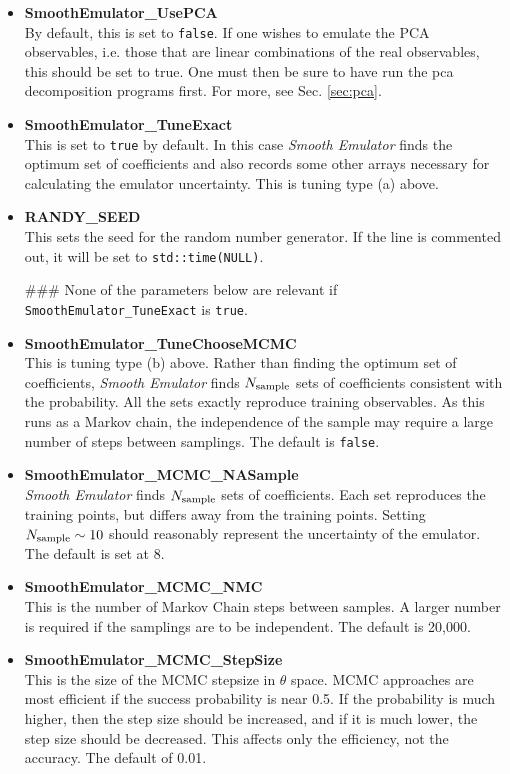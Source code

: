 \documentclass[UserManual.tex]{subfiles}
\begin{document}
\begin{itemize}
\item {\bf SmoothEmulator\_UsePCA}\\
By default, this is set to {\tt false}. If one wishes to emulate the PCA observables, i.e. those that are linear combinations of the real observables, this should be set to true. One must then be sure to have run the pca decomposition programs first. For more, see Sec. \ref{sec:pca}. 

\item {\bf SmoothEmulator\_TuneExact}\\
This is set to {\tt true} by default. In this case {\it Smooth Emulator} finds the optimum set of coefficients and also records some other arrays necessary for calculating the emulator uncertainty. This is tuning type (a) above.

\item {\bf RANDY\_SEED}\\
This sets the seed for the random number generator. If the line is commented out, it will be set to {\tt std::time(NULL)}.

\#\#\# None of the parameters below are relevant if {\tt SmoothEmulator\_TuneExact} is {\tt true}.

\item {\bf SmoothEmulator\_TuneChooseMCMC}\\
This is tuning type (b) above. Rather than finding the optimum set of coefficients, {\it Smooth Emulator} finds $N_{\rm sample}$ sets of coefficients consistent with the probability. All the sets exactly reproduce training observables. As this runs as a Markov chain, the independence of the sample may require a large number of steps between samplings. The default is {\tt false}.

\item {\bf SmoothEmulator\_MCMC\_NASample}\\
{\it Smooth Emulator} finds $N_{\rm sample}$ sets of coefficients. Each set reproduces the training points, but differs away from the training points. Setting $N_{\rm sample}\sim 10$ should reasonably represent the uncertainty of the emulator. The default is set at 8.

\item {\bf SmoothEmulator\_MCMC\_NMC}\\
This is the number of Markov Chain steps between samples. A larger number is required if the samplings are to be independent. The default is 20,000.

\item {\bf SmoothEmulator\_MCMC\_StepSize}\\
This is the size of the MCMC stepsize in $\theta$ space. MCMC approaches are most efficient if the success probability is near 0.5. If the probability is much higher, then the step size should be increased, and if it is much lower, the step size should be decreased. This affects only the efficiency, not the accuracy. The default of 0.01.


\end{itemize}
\end{document}

